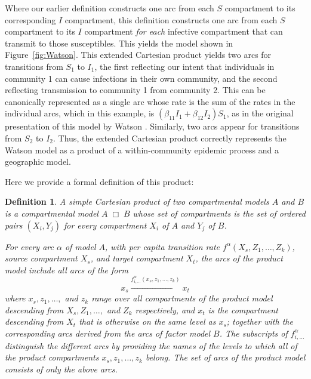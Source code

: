\documentclass[review]{elsarticle}
\newtheorem*{definition}{Definition}
\newcommand{\hl}[1]{#1}
\newcommand{\cartprod}{\;\Box\;}
\begin{document}
Where our earlier definition constructs one arc from each
$S$ compartment to its corresponding $I$ compartment,
this definition constructs one arc from each $S$ compartment
to its $I$ compartment \emph{for each}
infective compartment that can transmit to those susceptibles.
This yields the model shown in \hl{Figure~\mbox{\ref{fig:Watson}}}.
This extended Cartesian product yields two arcs for transitions from $S_1$ to $I_1$,
the first reflecting our intent that individuals in community 1 can cause infections in their
own community, and the second reflecting transmission to community 1 from community 2.  This
can be canonically represented as a single arc whose rate is the sum of the rates in the
individual arcs, which in this example, is $(\beta_{11} I_1 + \beta_{12} I_2) S_1$, as in
the original presentation of this model by Watson \cite{watson72}.
Similarly, two arcs appear for transitions from $S_2$ to $I_2$.  Thus, the extended
Cartesian product correctly represents the Watson model as a product of a within-community
epidemic process and a geographic model.

Here we provide a formal definition of this product:

\begin{definition}  A simple Cartesian product of two
compartmental models $A$ and $B$ is a compartmental
model $A\cartprod B$ whose set of compartments is
the set of ordered pairs $(X_i,Y_j)$ for every compartment $X_i$
of $A$ and $Y_j$ of $B$.

For every arc $\alpha$ of
model $A$, with per capita transition rate
$f^{\alpha}(X_s,Z_1,\ldots,Z_k)$,
source compartment $X_s$, and target compartment $X_t$,
the arcs of the product model include all arcs of the form
\[ x_s \xrightarrow{f^{\alpha}_{i,\ldots}(x_s,z_{1},\ldots,z_{k})} x_t \]
where $x_s,z_1,\ldots,$ and $z_k$ 
range over all compartments of the product model descending from
$X_s,Z_1,\ldots,$ and $Z_k$ respectively,
and $x_t$ is the compartment descending from $X_t$ that is
otherwise on the same level as $x_s$;
together with the corresponding arcs derived from the arcs of
factor model $B$.
The subscripts of $f^{\alpha}_{i,\ldots}$ distinguish the different arcs
by providing the names of the levels to which all of the product compartments
$x_s,z_1,\ldots,z_k$ belong.
The set of arcs of the product model consists of only the above arcs.
\end{definition}
\end{document}
